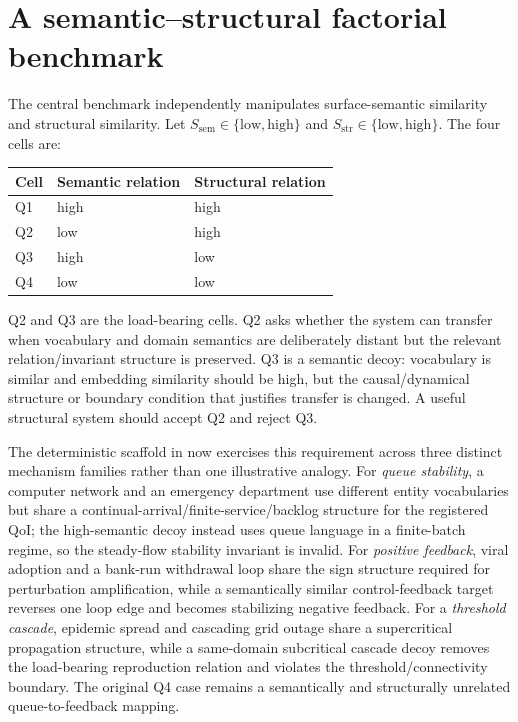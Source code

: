 \section{A semantic--structural factorial benchmark}

The central benchmark independently manipulates surface-semantic similarity and structural similarity. Let $S_{\mathrm{sem}}\in\{\mathrm{low},\mathrm{high}\}$ and $S_{\mathrm{str}}\in\{\mathrm{low},\mathrm{high}\}$. The four cells are:

\begin{center}
\begin{tabular}{lll}
\toprule
Cell & Semantic relation & Structural relation \\
\midrule
Q1 & high & high \\
Q2 & low & high \\
Q3 & high & low \\
Q4 & low & low \\
\bottomrule
\end{tabular}
\end{center}

Q2 and Q3 are the load-bearing cells. Q2 asks whether the system can transfer when vocabulary and domain semantics are deliberately distant but the relevant relation/invariant structure is preserved. Q3 is a semantic decoy: vocabulary is similar and embedding similarity should be high, but the causal/dynamical structure or boundary condition that justifies transfer is changed. A useful structural system should accept Q2 and reject Q3.

The deterministic scaffold in  now exercises this requirement across three distinct mechanism families rather than one illustrative analogy. For \emph{queue stability}, a computer network and an emergency department use different entity vocabularies but share a continual-arrival/finite-service/backlog structure for the registered QoI; the high-semantic decoy instead uses queue language in a finite-batch regime, so the steady-flow stability invariant is invalid. For \emph{positive feedback}, viral adoption and a bank-run withdrawal loop share the sign structure required for perturbation amplification, while a semantically similar control-feedback target reverses one loop edge and becomes stabilizing negative feedback. For a \emph{threshold cascade}, epidemic spread and cascading grid outage share a supercritical propagation structure, while a same-domain subcritical cascade decoy removes the load-bearing reproduction relation and violates the threshold/connectivity boundary. The original Q4 case remains a semantically and structurally unrelated queue-to-feedback mapping.

